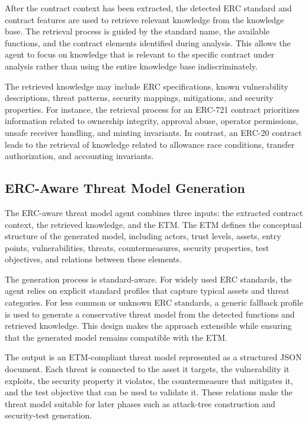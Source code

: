 After the contract context has been extracted, the detected ERC standard and contract features are used to retrieve relevant knowledge from the knowledge base. The retrieval process is guided by the standard name, the available functions, and the contract elements identified during analysis. This allows the agent to focus on knowledge that is relevant to the specific contract under analysis rather than using the entire knowledge base indiscriminately.

The retrieved knowledge may include ERC specifications, known vulnerability descriptions, threat patterns, security mappings, mitigations, and security properties. For instance, the retrieval process for an ERC-721 contract prioritizes information related to ownership integrity, approval abuse, operator permissions, unsafe receiver handling, and minting invariants. In contrast, an ERC-20 contract leads to the retrieval of knowledge related to allowance race conditions, transfer authorization, and accounting invariants.

\subsection{ERC-Aware Threat Model Generation}
\label{subsec:erc-aware-generation}

The ERC-aware threat model agent combines three inputs: the extracted contract context, the retrieved knowledge, and the ETM. The ETM defines the conceptual structure of the generated model, including actors, trust levels, assets, entry points, vulnerabilities, threats, countermeasures, security properties, test objectives, and relations between these elements.

The generation process is standard-aware. For widely used ERC standards, the agent relies on explicit standard profiles that capture typical assets and threat categories. For less common or unknown ERC standards, a generic fallback profile is used to generate a conservative threat model from the detected functions and retrieved knowledge. This design makes the approach extensible while ensuring that the generated model remains compatible with the ETM.

The output is an ETM-compliant threat model represented as a structured JSON document. Each threat is connected to the asset it targets, the vulnerability it exploits, the security property it violates, the countermeasure that mitigates it, and the test objective that can be used to validate it. These relations make the threat model suitable for later phases such as attack-tree construction and security-test generation.

